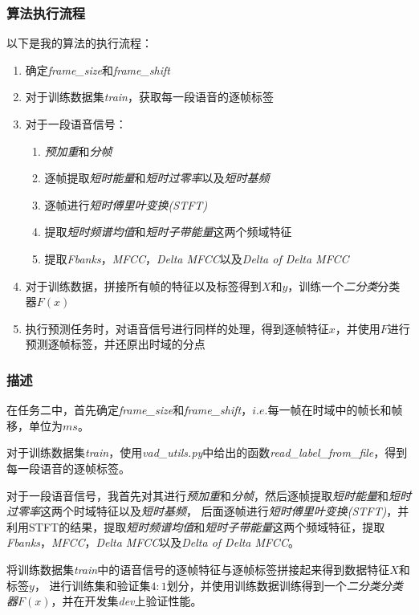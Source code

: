 \documentclass[a4paper]{article}
\begin{document}
\subsubsection{算法执行流程}
以下是我的算法的执行流程：
\begin{enumerate}
  \item 确定\emph{frame\_size}和\emph{frame\_shift}
  \item 对于训练数据集\emph{train}，获取每一段语音的逐帧标签
  \item 
  {
    对于一段语音信号：
    \begin{enumerate}
      \item \emph{预加重}和\emph{分帧}
      \item 逐帧提取\emph{短时能量}和\emph{短时过零率}以及\emph{短时基频}
      \item 逐帧进行\emph{短时傅里叶变换(STFT)}
      \item 提取\emph{短时频谱均值}和\emph{短时子带能量}这两个频域特征
      \item 提取\emph{Fbanks}，\emph{MFCC}，\emph{Delta MFCC}以及\emph{Delta of Delta MFCC}
    \end{enumerate}
  }
  \item 对于训练数据，拼接所有帧的特征以及标签得到$X$和$y$，训练一个\emph{二分类}分类器$F(x)$
  \item 执行预测任务时，对语音信号进行同样的处理，得到逐帧特征$x$，并使用$F$进行预测逐帧标签，并还原出时域的分点
\end{enumerate}

\subsubsection{描述}

在任务二中，首先确定\emph{frame\_size}和\emph{frame\_shift}，$i.e.$每一帧在时域中的帧长和帧移，单位为$ms$。

对于训练数据集\emph{train}，使用\emph{vad\_utils.py}中给出的函数\emph{read\_label\_from\_file}，得到每一段语音的逐帧标签。

对于一段语音信号，我首先对其进行\emph{预加重}和\emph{分帧}，然后逐帧提取\emph{短时能量}和\emph{短时过零率}这两个时域特征以及\emph{短时基频}，
后面逐帧进行\emph{短时傅里叶变换(STFT)}，并利用STFT的结果，提取\emph{短时频谱均值}和\emph{短时子带能量}这两个频域特征，提取\emph{Fbanks}，\emph{MFCC}，\emph{Delta MFCC}以及\emph{Delta of Delta MFCC}。

将训练数据集\emph{train}中的语音信号的逐帧特征与逐帧标签拼接起来得到数据特征$X$和标签$y$，
进行训练集和验证集$4 : 1 $划分，并使用训练数据训练得到一个\emph{二分类分类器}$F(x)$，并在开发集\emph{dev}上验证性能。
\end{document}
